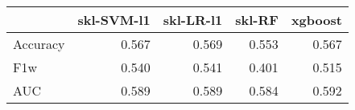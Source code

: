 \begin{tabular}{lrrrr}
\toprule
{} &  skl-SVM-l1 &  skl-LR-l1 &  skl-RF &  xgboost \\
\midrule
Accuracy &       0.567 &      0.569 &   0.553 &    0.567 \\
F1w      &       0.540 &      0.541 &   0.401 &    0.515 \\
AUC      &       0.589 &      0.589 &   0.584 &    0.592 \\
\bottomrule
\end{tabular}
